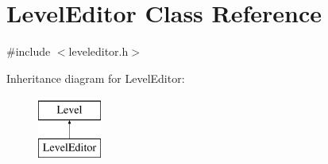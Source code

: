 \hypertarget{class_level_editor}{}\section{Level\+Editor Class Reference}
\label{class_level_editor}


{\ttfamily \#include $<$leveleditor.\+h$>$}

Inheritance diagram for Level\+Editor\+:\begin{figure}[H]
\begin{center}
\leavevmode
\includegraphics[height=2.000000cm]{class_level_editor}
\end{center}
\end{figure}
